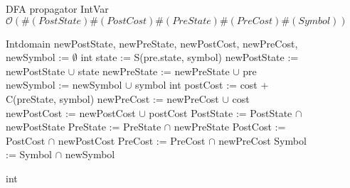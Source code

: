 \begin{figure}[H]
\begin{algorithm}[H]
\caption{DFA propagator IntVar\newline $\mathcal{O}(\#(PostState)\#(PostCost)\#(PreState)\#(PreCost)\#(Symbol))$}
\begin{algorithmic}[1]
\State Intdomain newPostState, newPreState, newPostCost, newPreCost, newSymbol := $\emptyset$
		\State int state := S(pre.state, symbol)
			\State newPostState := newPostState $\cup$ state
			\State newPreState := newPreState $\cup$ pre
			\State newSymbol := newSymbol $\cup$ symbol 
				\State int postCost := cost + C(preState, symbol)
					\State newPreCost := newPreCost $\cup$ cost
					\State newPostCost := newPostCost $\cup$ postCost
				\EndIf
			\EndFor
		\EndIf
	\EndFor
\EndFor
\State PostState := PostState $\cap$ newPostState
\State PreState := PreState $\cap$ newPreState
\State PostCost := PostCost $\cap$ newPostCost
\State PreCost := PreCost $\cap$ newPreCost
\State Symbol := Symbol $\cap$ newSymbol
\EndProcedure
\end{algorithmic}
\end{algorithm} 
\caption{int}\label{fig:algint}
\end{figure}

